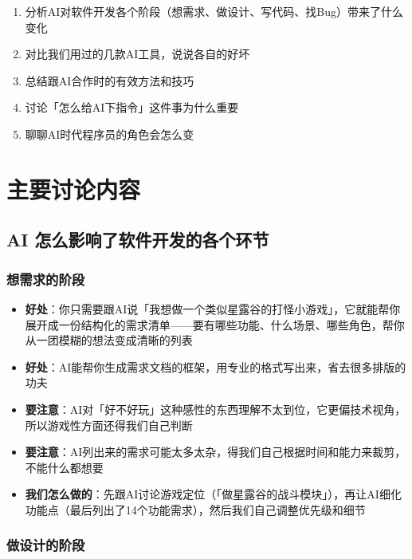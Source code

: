 \documentclass[12pt,a4paper]{article}
\begin{document}
\begin{enumerate}[leftmargin=2em]
    \item 分析AI对软件开发各个阶段（想需求、做设计、写代码、找Bug）带来了什么变化
    \item 对比我们用过的几款AI工具，说说各自的好坏
    \item 总结跟AI合作时的有效方法和技巧
    \item 讨论「怎么给AI下指令」这件事为什么重要
    \item 聊聊AI时代程序员的角色会怎么变
\end{enumerate}


\section{主要讨论内容}

\subsection{AI 怎么影响了软件开发的各个环节}

\subsubsection{想需求的阶段}

\begin{itemize}[leftmargin=2em]
    \item \textbf{好处}：你只需要跟AI说「我想做一个类似星露谷的打怪小游戏」，它就能帮你展开成一份结构化的需求清单——要有哪些功能、什么场景、哪些角色，帮你从一团模糊的想法变成清晰的列表
    \item \textbf{好处}：AI能帮你生成需求文档的框架，用专业的格式写出来，省去很多排版的功夫
    \item \textbf{要注意}：AI对「好不好玩」这种感性的东西理解不太到位，它更偏技术视角，所以游戏性方面还得我们自己判断
    \item \textbf{要注意}：AI列出来的需求可能太多太杂，得我们自己根据时间和能力来裁剪，不能什么都想要
    \item \textbf{我们怎么做的}：先跟AI讨论游戏定位（「做星露谷的战斗模块」），再让AI细化功能点（最后列出了14个功能需求），然后我们自己调整优先级和细节
\end{itemize}

\subsubsection{做设计的阶段}
\end{document}

